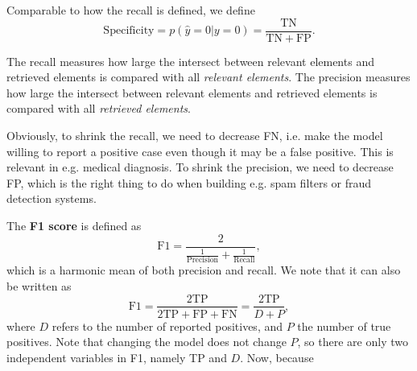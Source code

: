\documentclass[hyperref, a4paper, 12pt]{report}
\newcommand*{\concept}[1]{{\textbf{#1}}}
\begin{document}
Comparable to how the recall is defined, we define
\begin{equation}
    \mathrm{Specificity} = p(\hat{y} = 0 | y = 0) = \frac{\mathrm{TN}}{\mathrm{TN} + \mathrm{FP}}.
\end{equation}

The recall measures how large the intersect between relevant elements and retrieved elements is compared with all \emph{relevant elements}.
The precision measures how large the intersect between relevant elements and retrieved elements is compared with all \emph{retrieved elements}.

Obviously, to shrink the recall, we need to decrease FN,
i.e. make the model willing to report a positive case even though it may be a false positive.
This is relevant in e.g. medical diagnosis.
To shrink the precision, we need to decrease FP,
which is the right thing to do when building e.g. spam filters or fraud detection systems.

The \concept{F1 score} is defined as 
\begin{equation}
    \mathrm{F1} = \frac{2}{\frac{1}{\mathrm{Precision}} + \frac{1}{\mathrm{Recall}}},
\end{equation}
which is a harmonic mean of both precision and recall.
We note that it can also be written as 
\begin{equation}
    \mathrm{F1} = \frac{2\mathrm{TP}}{2\mathrm{TP} + \mathrm{FP} + \mathrm{FN}}
    = \frac{2\mathrm{TP}}{
        D + P
    },
\end{equation}
where $D$ refers to the number of reported positives, and $P$ the number of true positives.
Note that changing the model does not change $P$,
so there are only two independent variables in F1, namely TP and $D$.
Now, because 

\printbibliography[title=References]
\end{document}
